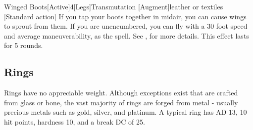 \begin{magicitemdef}{Winged Boots}[Active]{4}[Legs]{Transmutation [Augment]}{leather or textiles}
    [Standard action] If you tap your boots together in midair, you can cause wings to sprout from them.
    If you are unencumbered, you can fly with a 30 foot speed and average maneuverability, as the  spell.
    See , for more details.
    This effect lasts for 5 rounds.
\end{magicitemdef}

\subsection{Rings}

 Rings have no appreciable weight.
Although exceptions exist that are crafted from glass or bone, the vast majority of rings are forged from metal - usually precious metals such as gold, silver, and platinum.
A typical ring has AD 13, 10 hit points, hardness 10, and a break DC of 25.

\begin{comment}
\begin{dtable}
    \lcaption{Rings}
    \begin{dtabularx}{\columnwidth}{>{\lcol}X l}
        Ring & Market Price \\
        \hline
        Protection \plus1 & 2,000 gp \\
        Feather falling & 2,200 gp \\
        Climbing & 2,500 gp \\
        Jumping & 2,500 gp \\
        Sustenance & 2,500 gp \\
        Swimming & 2,500 gp \\
        Mind shielding & 8,000 gp \\
        Protection \plus2 & 8,000 gp \\
        Climbing, improved & 10,000 gp \\
        Jumping, improved & 10,000 gp \\
        Swimming, improved & 10,000 gp \\
        Energy resistance, minor & 12,000 gp \\
        Protection \plus3 & 18,000 gp \\
        Energy resistance, major & 28,000 gp \\
        Protection \plus4 & 32,000 gp \\
        Energy resistance, greater & 44,000 gp \\
        Protection \plus5 & 50,000 gp \\
    \end{dtabularx}
\end{dtable}
\end{comment}

